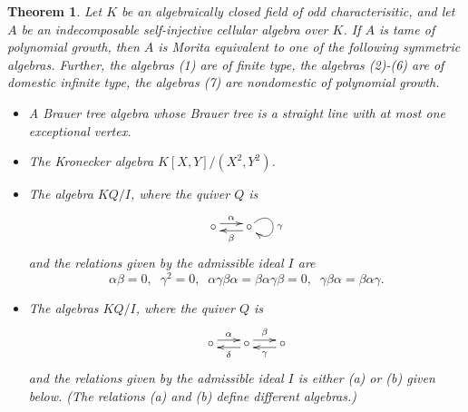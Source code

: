 \documentclass[12pt]{amsart}
\newtheorem{THEOREM}{Theorem}
\numberwithin{equation}{thm}
\newcounter{ni}
\begin{document}
\begin{THEOREM}
Let $K$ be an algebraically closed field of odd characterisitic, and let $A$ be an indecomposable self-injective cellular algebra over $K$. 
If $A$ is tame of polynomial growth, then
$A$ is Morita equivalent to one of the following symmetric algebras. Further, the algebras (1) are of finite type, 
the algebras (2)-(6) are of domestic infinite type, the algebras (7) are nondomestic of polynomial growth.

\begin{itemize}
\item[(1)]
A Brauer tree algebra whose Brauer tree is a straight line with at most one exceptional vertex. 
\item[(2)]
The Kronecker algebra $K[X,Y]/(X^2,Y^2)$.
\item[(3)]
The algebra $K Q/I$, where the quiver $Q$ is
\[
\begin{xy}
(0,0) *[o]+{\circ}="A", (10,0) *[o]+{\circ}="B",
\ar @(ur,dr) "B";"B"^{\gamma}
\ar @<1mm> "A";"B"^\alpha
\ar @<1mm> "B";"A"^\beta
\end{xy}
\]
and the relations given by the admissible ideal $I$ are
\[
\alpha\beta=0, \;\; \gamma^2=0, \;\;
\alpha\gamma\beta\alpha=\beta\alpha\gamma\beta=0, \;\; \gamma\beta\alpha=\beta\alpha\gamma.
\]
\item[(4)]
The algebras $KQ/I$, where the quiver $Q$ is
\[
\begin{xy}
(0,0) *[o]+{\circ}="A", (10,0) *[o]+{\circ}="B", (20,0) *[o]+{\circ}="C",
\ar @<1mm> "A";"B"^{\alpha}
\ar @<1mm> "B";"C"^{\beta}
\ar @<1mm> "B";"A"^{\delta}
\ar @<1mm> "C";"B"^{\gamma}
\end{xy}
\]
and the relations given by the admissible ideal $I$ is either (a) or (b) given below. (The relations 
(a) and (b) define different algebras.)


\end{itemize}
\end{THEOREM}
\end{document}
